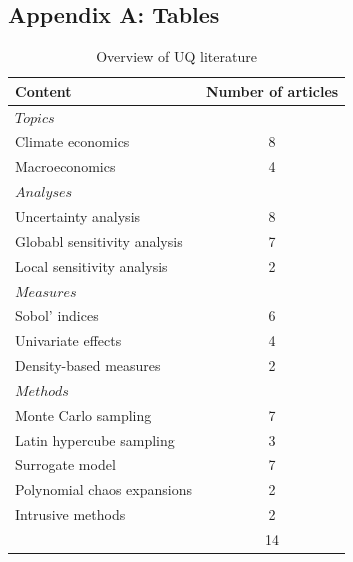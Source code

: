 

\thispagestyle{plain} %

\subsection{Appendix A: Tables}
\thispagestyle{plain} %

\phantom{This text will be invisible} 
\hspace{20cm}
\begin{table}[H]
	\centering
	\caption{Overview of UQ literature}
	\label{tab:lit}
	\renewcommand{\arraystretch}{1.2}%
	\begin{tabular}{lc}
		\toprule
		Content                      & Number of articles \\ \midrule
		$Topics$                       &                    \\
		\qquad Climate economics            & 8                  \\
		\qquad Macroeconomics               & 4                 \\ \midrule
		$Analyses$                     &                    \\
		\qquad Uncertainty analysis      & 8                  \\
		\qquad Globabl sensitivity analysis & 7                  \\
		\qquad Local sensitivity analysis   & 2                  \\ \midrule
		$Measures$                     &                    \\
		\qquad Sobol' indices               & 6                  \\
		\qquad Univariate effects           & 4                  \\
		\qquad Density-based measures & 2                  \\ \midrule
		$Methods$                      &                    \\
		\qquad Monte Carlo sampling         & 7                  \\
		\qquad Latin hypercube sampling         & 3                  \\
		\qquad Surrogate model              & 7                  \\
		\qquad Polynomial chaos expansions  & 2                  \\
		\qquad Intrusive methods            & 2                  \\ \midrule
		& 14                 \\ \bottomrule
	\end{tabular}
\end{table}
\noindent

